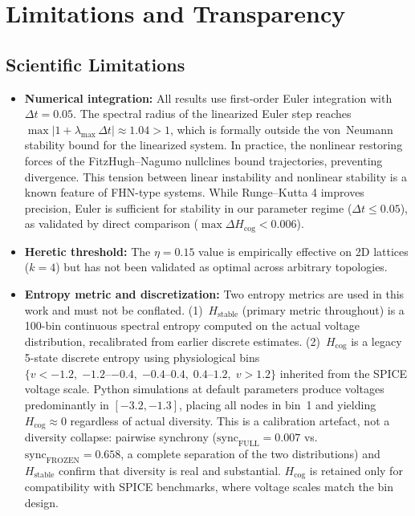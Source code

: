 ﻿\documentclass[11pt]{article}
\begin{document}
\section{Limitations and Transparency}
\label{sec:limitations}

\subsection{Scientific Limitations}
\begin{itemize}
\item \textbf{Numerical integration:} All results use first-order Euler integration with $\Delta t = 0.05$. The spectral radius of the linearized Euler step reaches $\max|1 + \lambda_{\max}\,\Delta t| \approx 1.04 > 1$, which is formally outside the von~Neumann stability bound for the linearized system. In practice, the nonlinear restoring forces of the FitzHugh--Nagumo nullclines bound trajectories, preventing divergence. This tension between linear instability and nonlinear stability is a known feature of FHN-type systems. While Runge--Kutta 4 improves precision, Euler is sufficient for stability in our parameter regime ($\Delta t \le 0.05$), as validated by direct comparison ($\max \Delta H_{\text{cog}} < 0.006$).
\item \textbf{Heretic threshold:} The $\eta = 0.15$ value is empirically effective on 2D lattices ($k = 4$) but has not been validated as optimal across arbitrary topologies.
\item \textbf{Entropy metric and discretization:} Two entropy metrics are used in this work and must not be conflated. (1)~$H_{\text{stable}}$ (primary metric throughout) is a 100-bin continuous spectral entropy computed on the actual voltage distribution, recalibrated from earlier discrete estimates. (2)~$H_{\text{cog}}$ is a legacy 5-state discrete entropy using physiological bins $\{v < -1.2,\; {-1.2}\text{--}{-0.4},\; {-0.4}\text{--}{0.4},\; {0.4}\text{--}{1.2},\; v > 1.2\}$ inherited from the SPICE voltage scale. Python simulations at default parameters produce voltages predominantly in $[-3.2, -1.3]$, placing all nodes in bin~1 and yielding $H_{\text{cog}} \approx 0$ regardless of actual diversity. This is a calibration artefact, not a diversity collapse: pairwise synchrony ($\text{sync}_{\text{FULL}} = 0.007$ vs.\ $\text{sync}_{\text{FROZEN}} = 0.658$, a complete separation of the two distributions) and $H_{\text{stable}}$ confirm that diversity is real and substantial. $H_{\text{cog}}$ is retained only for compatibility with SPICE benchmarks, where voltage scales match the bin design.

\end{itemize}
\end{document}
